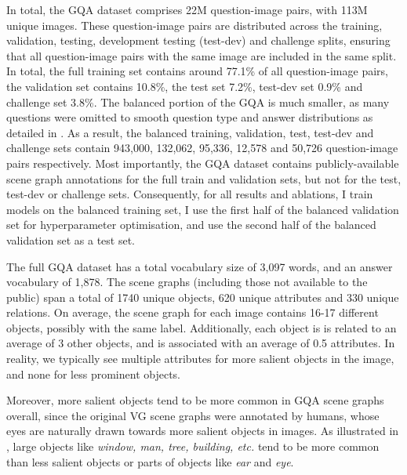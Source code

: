 



In total, the GQA dataset comprises 22M question-image pairs, with 113M unique images. These question-image pairs are distributed across the training, validation, testing, development testing (test-dev) and challenge splits, ensuring that all question-image pairs with the same image are included in the same split. In total, the full training set contains around 77.1\% of all question-image pairs, the validation set contains 10.8\%, the test set 7.2\%, test-dev set 0.9\% and challenge set 3.8\%. The balanced portion of the GQA is much smaller, as many questions were omitted to smooth question type and answer distributions as detailed in \subsectionautorefname{ \ref{subsec:lanauge_priors_in_vqa_datasets}}. As a result, the balanced training, validation, test, test-dev and challenge sets contain 943,000, 132,062, 95,336, 12,578 and 50,726 question-image pairs respectively. Most importantly, the GQA dataset contains publicly-available scene graph annotations for the full train and validation sets, but not for the test, test-dev or challenge sets. Consequently, for all results and ablations, I train models on the balanced training set, I use the first half of the balanced validation set for hyperparameter optimisation, and use the second half of the balanced validation set as a test set.

The full GQA dataset has a total vocabulary size of 3,097 words, and an answer vocabulary of 1,878. The scene graphs (including those not available to the public) span a total of 1740 unique objects, 620 unique attributes and 330 unique relations. On average, the scene graph for each image contains 16-17 different objects, possibly with the same label. Additionally, each object is is related to an average of 3 other objects, and is associated with an average of 0.5 attributes. In reality, we typically see multiple attributes for more salient objects in the image, and none for less prominent objects.

Moreover, more salient objects tend to be more common in GQA scene graphs overall, since the original VG scene graphs were annotated by humans, whose eyes are naturally drawn towards more salient objects in images. As illustrated in \figureautorefname{ \ref{fig:gqa_scene_graph_object_relation_attribute_distribution}}, large objects like \textit{window, man, tree, building, etc.} tend to be more common than less salient objects or parts of objects like \textit{ear} and \textit{eye}.

